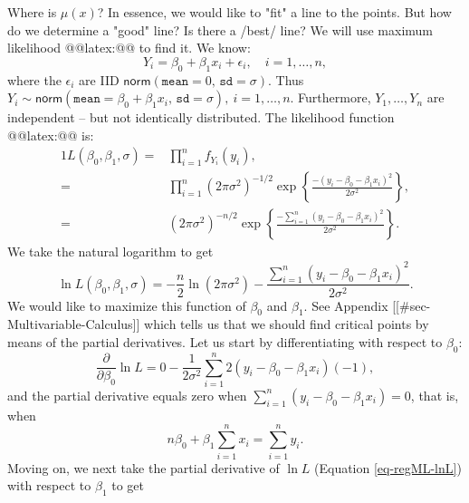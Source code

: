 Where is \( \mu(x) \)? In essence, we would like to "fit" a line to
the points. But how do we determine a "good" line? Is there a /best/
line? We will use maximum likelihood @@latex:@@ to find it. We know:
\begin{equation}
Y_{i} = \beta_{0} + \beta_{1}x_{i} + \epsilon_{i},\quad i=1,\ldots,n,
\end{equation}
where the \( \epsilon_{i} \) are IID
\(\mathsf{norm}(\mathtt{mean}=0,\,\mathtt{sd}=\sigma) \). Thus \(
Y_{i}\sim\mathsf{norm}(\mathtt{mean}=\beta_{0}+\beta_{1}x_{i},\,\mathtt{sd}=\sigma),\
i=1,\ldots,n \). Furthermore, \( Y_{1},\ldots,Y_{n} \) are independent
-- but not identically distributed. The likelihood
function @@latex:@@ is:
\begin{alignat}{1}
L(\beta_{0},\beta_{1},\sigma)= & \prod_{i=1}^{n}f_{Y_{i}}(y_{i}),\\
= & \prod_{i=1}^{n}(2\pi\sigma^{2})^{-1/2}\exp\left\{ \frac{-(y_{i}-\beta_{0}-\beta_{1}x_{i})^{2}}{2\sigma^{2}}\right\} ,\\
= & (2\pi\sigma^{2})^{-n/2}\exp\left\{ \frac{-\sum_{i=1}^{n}(y_{i}-\beta_{0}-\beta_{1}x_{i})^{2}}{2\sigma^{2}}\right\} .
\end{alignat}
We take the natural logarithm to get
\begin{equation}
\label{eq-regML-lnL}
\ln L(\beta_{0},\beta_{1},\sigma)=-\frac{n}{2}\ln(2\pi\sigma^{2})-\frac{\sum_{i=1}^{n}(y_{i}-\beta_{0}-\beta_{1}x_{i})^{2}}{2\sigma^{2}}.
\end{equation}
We would like to maximize this function of \( \beta_{0} \) and \(
\beta_{1} \). See Appendix [[#sec-Multivariable-Calculus]] which tells us that
we should find critical points by means of the partial
derivatives. Let us start by differentiating with respect to
\(\beta_{0} \):
\begin{equation}
\frac{\partial}{\partial\beta_{0}}\ln L=0-\frac{1}{2\sigma^{2}}\sum_{i=1}^{n}2(y_{i}-\beta_{0}-\beta_{1}x_{i})(-1),
\end{equation}
and the partial derivative equals zero when \(
\sum_{i=1}^{n}(y_{i}-\beta_{0}-\beta_{1}x_{i}) = 0 \), that is, when
\begin{equation}
\label{eq-regML-a}
n \beta_{0} + \beta_{1} \sum_{i=1}^{n} x_{i} = \sum_{i = 1}^{n}y_{i}.
\end{equation}
Moving on, we next take the partial derivative of \( \ln L \)
(Equation \eqref{eq-regML-lnL}) with respect to \( \beta_{1} \) to get

